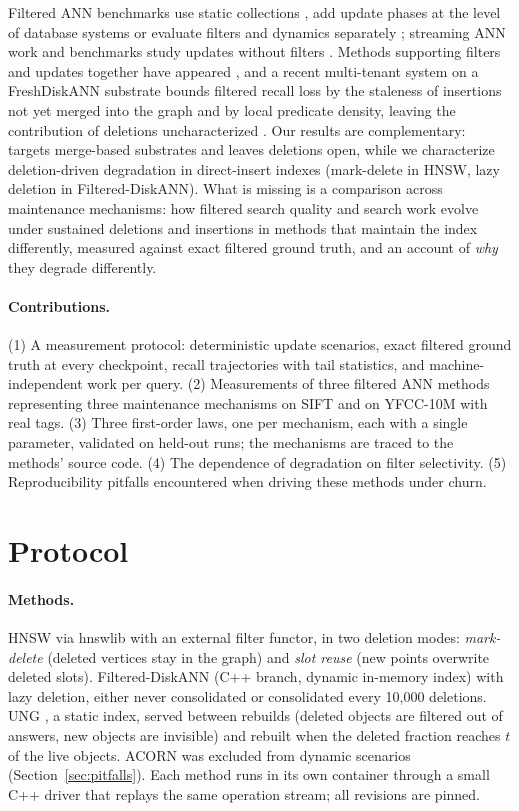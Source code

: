 \documentclass[10pt,a4paper]{article}
\begin{document}
Filtered ANN benchmarks use static collections \cite{fannbench}, add update phases at the level of database systems \cite{vecbench} or evaluate filters and dynamics separately \cite{annlib}; streaming ANN work and benchmarks study updates without filters \cite{freshdiskann,bigann23,candor}. Methods supporting filters and updates together have appeared \cite{ema}, and a recent multi-tenant system on a FreshDiskANN substrate bounds filtered recall loss by the staleness of insertions not yet merged into the graph and by local predicate density, leaving the contribution of deletions uncharacterized \cite{staleness}. Our results are complementary: \cite{staleness} targets merge-based substrates and leaves deletions open, while we characterize deletion-driven degradation in direct-insert indexes (mark-delete in HNSW, lazy deletion in Filtered-DiskANN). What is missing is a comparison across maintenance mechanisms: how filtered search quality and search work evolve under sustained deletions and insertions in methods that maintain the index differently, measured against exact filtered ground truth, and an account of \emph{why} they degrade differently.

\paragraph{Contributions.} (1) A measurement protocol: deterministic update scenarios, exact filtered ground truth at every checkpoint, recall trajectories with tail statistics, and machine-independent work per query. (2) Measurements of three filtered ANN methods representing three maintenance mechanisms on SIFT and on YFCC-10M with real tags. (3) Three first-order laws, one per mechanism, each with a single parameter, validated on held-out runs; the mechanisms are traced to the methods' source code. (4) The dependence of degradation on filter selectivity. (5) Reproducibility pitfalls encountered when driving these methods under churn.

\section{Protocol}

\paragraph{Methods.} HNSW via hnswlib \cite{hnsw} with an external filter functor, in two deletion modes: \emph{mark-delete} (deleted vertices stay in the graph) and \emph{slot reuse} (new points overwrite deleted slots). Filtered-DiskANN \cite{filtereddiskann} (C++ branch, dynamic in-memory index) with lazy deletion, either never consolidated or consolidated every 10{,}000 deletions. UNG \cite{ung}, a static index, served between rebuilds (deleted objects are filtered out of answers, new objects are invisible) and rebuilt when the deleted fraction reaches $t$ of the live objects. ACORN \cite{acorn} was excluded from dynamic scenarios (Section~\ref{sec:pitfalls}). Each method runs in its own container through a small C++ driver that replays the same operation stream; all revisions are pinned.
\end{document}
